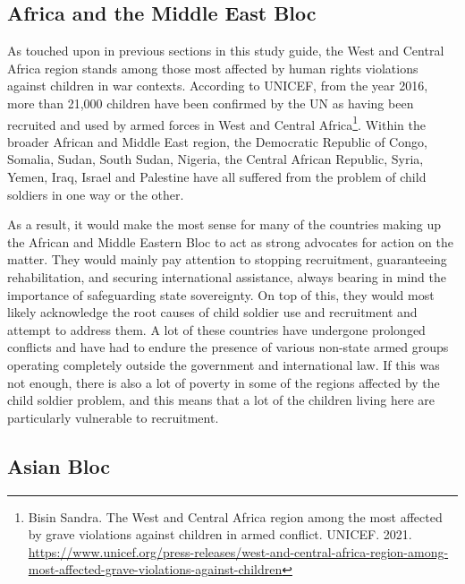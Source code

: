 \subsection{Africa and the Middle East Bloc}

As touched upon in previous sections in this study guide, the West and Central Africa region stands among those most affected by human rights violations against children in war contexts. According to UNICEF, from the year 2016, more than 21,000 children have been confirmed by the UN as having been recruited and used by armed forces in West and Central Africa\footnote{Bisin Sandra. The West and Central Africa region among the most affected by grave violations against children in armed conflict. UNICEF. 2021. \url{https://www.unicef.org/press-releases/west-and-central-africa-region-among-most-affected-grave-violations-against-children}}. Within the broader African and Middle East region, the Democratic Republic of Congo, Somalia, Sudan, South Sudan, Nigeria, the Central African Republic, Syria, Yemen, Iraq, Israel and Palestine have all suffered from the problem of child soldiers in one way or the other.

As a result, it would make the most sense for many of the countries making up the African and Middle Eastern Bloc to act as strong advocates for action on the matter. They would mainly pay attention to stopping recruitment, guaranteeing rehabilitation, and securing international assistance, always bearing in mind the importance of safeguarding state sovereignty. On top of this, they would most likely acknowledge the root causes of child soldier use and recruitment and attempt to address them. A lot of these countries have undergone prolonged conflicts and have had to endure the presence of various non-state armed groups operating completely outside the government and international law. If this was not enough, there is also a lot of poverty in some of the regions affected by the child soldier problem, and this means that a lot of the children living here are particularly vulnerable to recruitment.

\subsection{Asian Bloc}

